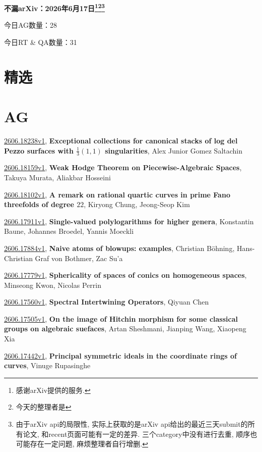 \documentclass[9pt, a4paper]{article}
\theoremstyle{plain}
\theoremstyle{definition}
\theoremstyle{remark}
\newcommand{\arxiv}[3]{\href{https://arxiv.org/abs/#1}{#1}, \textbf{\textcolor{arxivblue}{#2}}, #3}
\newcommand{\AGnumber}{28}
\newcommand{\RTQAnumber}{31}
\newcommand{\NewestDate}{2026年6月17日}
\newcommand{\todayarXiver}{} %
\begin{document}
\begin{center}
    \Huge\textbf{不漏arXiv：\NewestDate\footnote{感谢arXiv提供的服务.}\footnote{今天的整理者是\todayarXiver}\footnote{由于arXiv api的局限性, 实际上获取的是arXiv api给出的最近三天submit的所有论文, 和recent页面可能有一定的差异. 三个category中没有进行去重, 顺序也可能存在一定问题, 麻烦整理者自行增删.}} \\
\end{center}

\setcounter{section}{-1}

\begin{center}
    今日AG数量：\AGnumber
    
    今日RT \& QA数量：\RTQAnumber
    
\end{center}


\section{精选}


\section{AG}
\arxiv{2606.18238v1}{Exceptional collections for canonical stacks of log del Pezzo surfaces with $\frac13(1,1)$ singularities}{Alex Junior Gomez Saltachin}

\arxiv{2606.18159v1}{Weak Hodge Theorem on Piecewise-Algebraic Spaces}{Takuya Murata, Aliakbar Hosseini}

\arxiv{2606.18102v1}{A remark on rational quartic curves in prime Fano threefolds of degree $22$}{Kiryong Chung, Jeong-Seop Kim}

\arxiv{2606.17911v1}{Single-valued polylogarithms for higher genera}{Konstantin Baune, Johannes Broedel, Yannis Moeckli}

\arxiv{2606.17884v1}{Naive atoms of blowups: examples}{Christian Böhning, Hans-Christian Graf von Bothmer, Zac Su'a}

\arxiv{2606.17779v1}{Sphericality of spaces of conics on homogeneous spaces}{Minseong Kwon, Nicolas Perrin}

\arxiv{2606.17560v1}{Spectral Intertwining Operators}{Qiyuan Chen}

\arxiv{2606.17505v1}{On the image of Hitchin morphism for some classical groups on algebraic suefaces}{Artan Sheshmani, Jianping Wang, Xiaopeng Xia}

\arxiv{2606.17442v1}{Principal symmetric ideals in the coordinate rings of curves}{Vinuge Rupasinghe}
\end{document}
